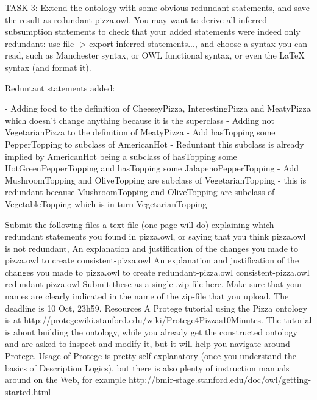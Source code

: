 TASK 3: Extend the ontology with some obvious redundant statements, and save the result as redundant-pizza.owl. You may want to derive all inferred subsumption statements to check that your added statements were indeed only redundant: use file -> export inferred statements..., and choose a syntax you can read, such as Manchester syntax, or OWL functional syntax, or even the LaTeX syntax (and format it).

Reduntant statements added:

- Adding food to the definition of CheeseyPizza, InterestingPizza and MeatyPizza which doesn’t change anything because it is the superclass
- Adding not VegetarianPizza to the definition of MeatyPizza
- Add hasTopping some PepperTopping to subclass of AmericanHot - Reduntant this subclass is already implied by AmericanHot being a subclass of hasTopping some HotGreenPepperTopping and hasTopping some JalapenoPepperTopping
- Add MushroomTopping and OliveTopping are subclass of VegetarianTopping - this is redundant because MushroomTopping and OliveTopping are subclass of VegetableTopping which is in turn VegetarianTopping
 

Submit the following files
a text-file (one page will do) explaining
which redundant statements you found in pizza.owl, or saying that you think pizza.owl is not redundant,
An explanation and justification of the changes you made to pizza.owl to create consistent-pizza.owl
An explanation and justification of the changes you made to pizza.owl to create redundant-pizza.owl
consistent-pizza.owl
redundant-pizza.owl
Submit these as a single .zip file here. Make sure that your names are clearly indicated in the name of the zip-file that you upload. The deadline is 10 Oct, 23h59.
Resources
A Protege tutorial using the Pizza ontology is at http://protegewiki.stanford.edu/wiki/Protege4Pizzas10Minutes. The tutorial is about building the ontology, while you already get the constructed ontology and are asked to inspect and modify it, but it will help you navigate around Protege.
Usage of Protege is pretty self-explanatory (once you understand the basics of Description Logics), but there is also plenty of instruction manuals around on the Web, for example http://bmir-stage.stanford.edu/doc/owl/getting-started.html
